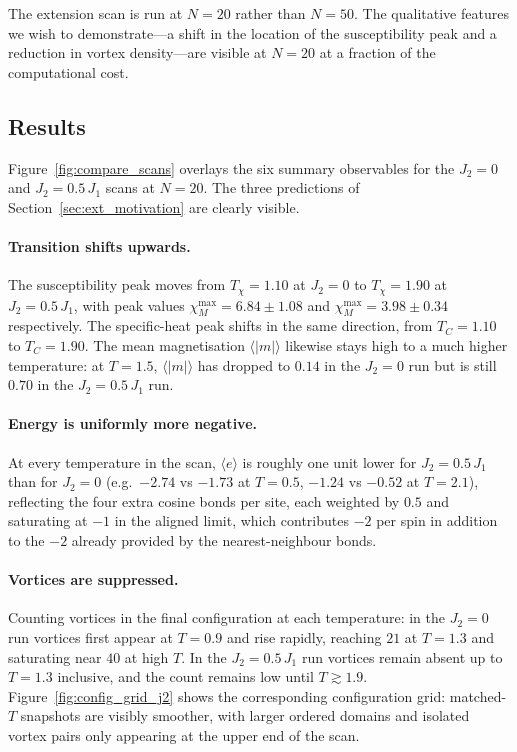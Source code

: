 \documentclass[11pt,a4paper]{article}
\begin{document}
The extension scan is run at $N = 20$ rather than $N = 50$. The qualitative features we wish to demonstrate---a shift in the location of the susceptibility peak and a reduction in vortex density---are visible at $N = 20$ at a fraction of the computational cost.

\subsection{Results}
\label{sec:ext_results}

Figure~\ref{fig:compare_scans} overlays the six summary observables for the $J_2 = 0$ and $J_2 = 0.5\,J_1$ scans at $N = 20$. The three predictions of Section~\ref{sec:ext_motivation} are clearly visible.

\paragraph{Transition shifts upwards.} The susceptibility peak moves from
$T_\chi = 1.10$ at $J_2 = 0$ to $T_\chi = 1.90$ at $J_2 = 0.5\,J_1$, with peak values $\chi_M^{\max} = 6.84 \pm 1.08$ and $\chi_M^{\max} = 3.98 \pm 0.34$ respectively. The specific-heat peak shifts in the same direction, from $T_C = 1.10$ to $T_C = 1.90$. The mean magnetisation $\langle |m| \rangle$ likewise stays high to a much higher temperature: at $T = 1.5$, $\langle |m| \rangle$ has dropped to $0.14$ in the $J_2 = 0$ run but is still $0.70$ in the $J_2 = 0.5\,J_1$ run.

\paragraph{Energy is uniformly more negative.} At every temperature in the
scan, $\langle e \rangle$ is roughly one unit lower for $J_2 = 0.5\,J_1$ than for $J_2 = 0$ (e.g.\ $-2.74$ vs $-1.73$ at $T = 0.5$, $-1.24$ vs $-0.52$ at $T = 2.1$), reflecting the four extra cosine bonds per site, each weighted by $0.5$ and saturating at $-1$ in the aligned limit, which contributes $-2$ per spin in addition to the $-2$ already provided by the nearest-neighbour bonds.

\paragraph{Vortices are suppressed.} Counting vortices in the final
configuration at each temperature: in the $J_2 = 0$ run vortices first appear at $T = 0.9$ and rise rapidly, reaching $21$ at $T = 1.3$ and saturating near $40$ at high $T$. In the $J_2 = 0.5\,J_1$ run vortices remain absent up to $T = 1.3$ inclusive, and the count remains low until $T \gtrsim 1.9$. Figure~\ref{fig:config_grid_j2} shows the corresponding configuration grid: matched-$T$ snapshots are visibly smoother, with larger ordered domains and isolated vortex pairs only appearing at the upper end of the scan.
\end{document}
